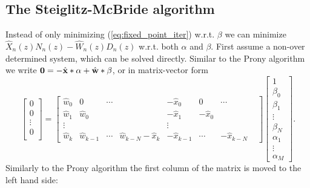 \documentclass[10pt]{amsart}
\begin{document}
\subsection{The Steiglitz-McBride algorithm}
Instead of only minimizing (\ref{eq:fixed_point_iter}) w.r.t. $\beta$ we can minimize $\hat X_n(z) N_n(z) - \hat W_n(z) D_n(z)$ w.r.t. both $\alpha$ and $\beta$. First assume a non-over determined system, which can be solved directly. Similar to the Prony algorithm we write
${\bf 0} = -{\hat {\bf x}} * \alpha + {\hat {\bf w}} * \beta$, or in matrix-vector form
 \begin{equation}
	\left[\begin{array}{c}0 \\0 \\\vdots \\0 \\ \end{array}\right] =
	\left[\begin{array}{cccccccc} \hat w_{0} & 0 & \cdots &  & -{\hat x_0} & 0 & \cdots \\
		\hat w_{1} & \hat w_{0} &   &  &   -\hat x_{1} & -\hat x_{0} &   &   \\
		\vdots &   &   & & \vdots  \\
		\hat w_k & \hat w_{k-1} & \cdots & \hat w_{k-N} -\hat x_k & -\hat x_{k-1} & \cdots & -\hat x_{k-N}
	\end{array}\right]
	\left[\begin{array}{c} 1 \\\beta_0 \\\beta_1 \\\vdots \\\beta_N \\ \alpha_1 \\ \vdots \\ \alpha_M\end{array}\right].
\end{equation}
Similarly to the Prony algorithm the first column of the matrix is moved to the left hand side:
\end{document}
